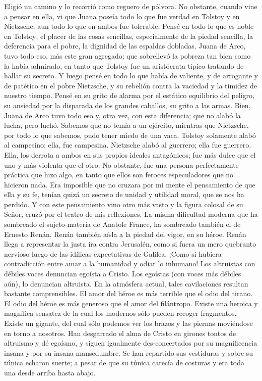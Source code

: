 Eligió un camino y lo recorrió como reguero de pólvora. No obstante, cuando vine a pensar en ella,
vi que Juana poseía todo lo que fue verdad en Tolstoy y en Nietzsche; aun todo lo que en ambos fue
tolerable. Pensé en todo lo que es noble en Tolstoy; el placer de las cosas sencillas, especialmente de la
piedad sencilla, la deferencia para el pobre, la dignidad de las espaldas dobladas. Juana de Arco, tuvo
todo eso, más este gran agregado; que sobrellevó la pobreza tan bien como la había admirado, en tanto
que Tolstoy fue un aristócrata típico tratando de hallar su secreto. Y luego pensé en todo lo que había de
valiente, y de arrogante y de patético en el pobre Nietzsche, y su rebelión contra la vaciedad y la timidez
de nuestro tiempo. Pensé en su grito de alarma por el estático equilibrio del peligro, su ansiedad por la
disparada de los grandes caballos, su grito a las armas. Bien, Juana de Arco tuvo todo eso y, otra vez, con
esta diferencia; que no alabó la lucha, pero luchó. Sabemos que no temía a un ejército, mientras que
Nietzsche, por todo lo que sabemos, pudo tener miedo de una vaca. Tolstoy solamente alabó al
campesino; ella, fue campesina. Nietzsche alabó al guerrero; ella fue guerrero. Ella, los derrota a ambos
en sus propios ideales antagónicos; fue más dulce que el uno y más violenta que el otro. No obstante, fue
una persona perfectamente práctica que hizo algo, en tanto que ellos son feroces especuladores que no
hicieron nada. Era imposible que no cruzara por mi mente el pensamiento de que ella y su fe, tenían quizá
un secreto de unidad y utilidad moral, que se nos ha perdido. Y con este pensamiento vino otro más vasto
y la figura colosal de su Señor, cruzó por el teatro de mis reflexiones. La misma dificultad moderna que
ha sombreado el sujeto-materia de Anatole France, ha sombreado también el de Ernesto Renán. Renán
también aísla a la piedad del vigor, en su héroe. Renán llega a representar la justa ira contra Jerusalén,
como si fuera un mero quebranto nervioso luego de las idílicas expectativas de Galilea. ¡Como si hubiera
contradicción entre amar a la humanidad y odiar lo inhumano! Los altruistas con débiles voces denuncian
egoísta a Cristo. Los egoístas (con voces más débiles aún), lo denuncian altruista. En la atmósfera actual,
tales cavilaciones resultan bastante comprensibles. El amor del héroe es más terrible que el odio del
tirano. El odio del héroe es más generoso que el amor del filántropo. Existe una heroica y magnífica
sensatez de la cual los modernos sólo pueden recoger fragmentos. Existe un gigante, del cual sólo
podemos ver los brazos y las piernas moviéndose en torno a nosotros. Han desgarrado el alma de Cristo
en girones tontos de altruismo y dé egoísmo, y siguen igualmente des-concertados por su magnificencia
insana y por su insana mansedumbre. Se han repartido sus vestiduras y sobre su túnica echaron suerte; a
pesar de que su túnica carecía de costuras y era toda una desde arriba hasta abajo.
\finalCapituloOrnamento
